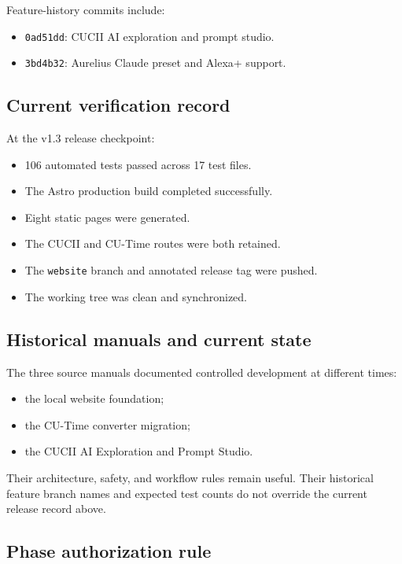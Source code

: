 \documentclass[11pt,letterpaper]{article}
\newcommand{\branchname}[1]{\texttt{#1}}
\newcommand{\release}[1]{\texttt{#1}}
\begin{document}
Feature-history commits include:

\begin{itemize}
    \item \release{0ad51dd}: CUCII AI exploration and prompt studio.
    \item \release{3bd4b32}: Aurelius Claude preset and Alexa+ support.
\end{itemize}

\subsection{Current verification record}

At the v1.3 release checkpoint:

\begin{itemize}
    \item 106 automated tests passed across 17 test files.
    \item The Astro production build completed successfully.
    \item Eight static pages were generated.
    \item The CUCII and CU-Time routes were both retained.
    \item The \branchname{website} branch and annotated release tag were pushed.
    \item The working tree was clean and synchronized.
\end{itemize}

\subsection{Historical manuals and current state}

The three source manuals documented controlled development at different
times:

\begin{itemize}
    \item the local website foundation;
    \item the CU-Time converter migration;
    \item the CUCII AI Exploration and Prompt Studio.
\end{itemize}

Their architecture, safety, and workflow rules remain useful. Their historical
feature branch names and expected test counts do not override the current
release record above.

\subsection{Phase authorization rule}
\end{document}
